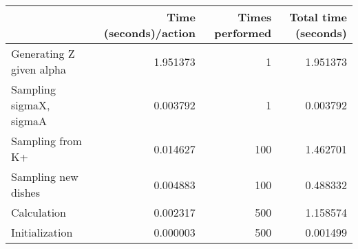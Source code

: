 \begin{tabular}{lrrr}
\toprule
{} &  Time (seconds)/action &  Times performed &  Total time (seconds) \\
\midrule
Generating Z given alpha &               1.951373 &                1 &              1.951373 \\
Sampling sigmaX, sigmaA  &               0.003792 &                1 &              0.003792 \\
Sampling from K+         &               0.014627 &              100 &              1.462701 \\
Sampling new dishes      &               0.004883 &              100 &              0.488332 \\
Calculation              &               0.002317 &              500 &              1.158574 \\
Initialization           &               0.000003 &              500 &              0.001499 \\
\bottomrule
\end{tabular}
